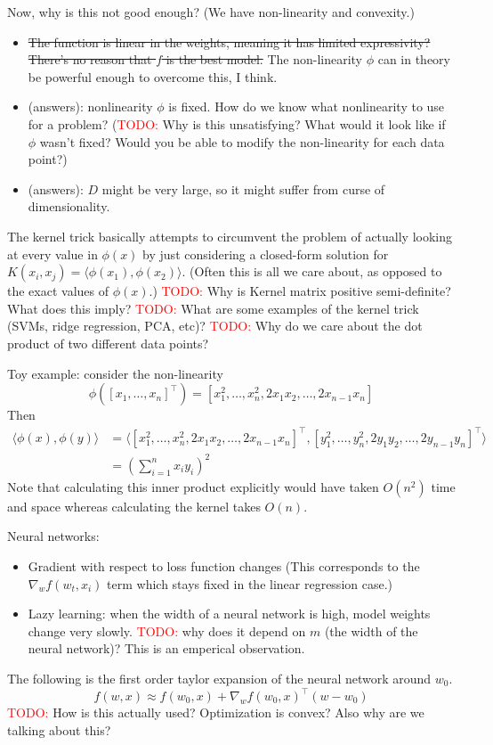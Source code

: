 \documentclass[answers,12pt]{exam}
\newcommand{\TODO}{\textcolor{red}{TODO:}}
\begin{document}
Now, why is this not good enough?
(We have non-linearity and convexity.)
\begin{itemize}
    \item \sout{The function is linear in the weights, meaning it has limited expressivity?
    There's no reason that $f$ is the best model.}
    The non-linearity $\phi$ can in theory be powerful enough to overcome this, I think.
    \item (answers): nonlinearity $\phi$ is fixed.
    How do we know what nonlinearity to use for a problem?
    (\TODO{} Why is this unsatisfying? What would it look like if $\phi$ wasn't fixed? Would you be able to modify the non-linearity for each data point?)
    \item (answers): $D$ might be very large, so it might suffer from curse of dimensionality.
\end{itemize}

The kernel trick basically attempts to circumvent the problem of actually looking at every value in $\phi(x)$ by just considering a closed-form solution for $K(x_i,x_j) = \langle \phi(x_1),\phi(x_2) \rangle$.
(Often this is all we care about, as opposed to the exact values of $\phi(x)$.)
\TODO{} Why is Kernel matrix positive semi-definite?
What does this imply?
\TODO{} What are some examples of the kernel trick (SVMs, ridge regression, PCA, etc)?
\TODO{} Why do we care about the dot product of two different data points?

\begin{mdframed}
Toy example: consider the non-linearity \[\phi({[x_1, \ldots, x_n]}^{\top}) = [x_1^2, \ldots, x_n^2, 2x_1x_2, \ldots, 2x_{n-1}x_n]\]
Then
\[
    \begin{aligned}
    \langle \phi(x), \phi(y) \rangle &=
    \langle {[x_1^2, \ldots, x_n^2, 2x_1x_2, \ldots, 2x_{n-1}x_n]}^{\top}, {[y_1^2, \ldots, y_n^2, 2y_1y_2, \ldots, 2y_{n-1}y_n]}^{\top} \rangle \\
    &= {\left( \sum_{i=1}^n x_i y_i \right)}^2
    \end{aligned}
\]
Note that calculating this inner product explicitly would have taken $O(n^2)$ time and space whereas calculating the kernel takes $O(n)$.
\end{mdframed}

Neural networks:
\begin{itemize}
    \item Gradient with respect to loss function changes
    (This corresponds to the $\nabla_w f(w_t, x_i)$ term which stays fixed in the linear regression case.)
    \item Lazy learning: when the width of a neural network is high, model weights change very slowly.
    \TODO{} why does it depend on $m$ (the width of the neural network)?
    This is an emperical observation.
\end{itemize}
The following is the first order taylor expansion of the neural network around $w_0$.
\[
    f(w,x) \approx f(w_0,x) + \nabla_w {f(w_0,x)}^{\top}(w-w_0)
\]
\TODO{} How is this actually used?
Optimization is convex?
Also why are we talking about this? 
\end{document}

